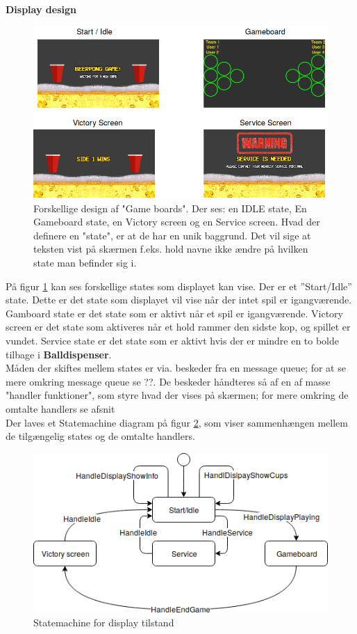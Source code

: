 \documentclass[Softwaredesign/Softwaredesign_main.tex]{subfiles}
\begin{document}
\textbf{Display design}
\begin{figure}[H]
    \centering
    \includegraphics[scale=0.5]{Softwaredesign/GUI/Pictures/Boards.png}
    \caption{Forskellige design af "Game boards". Der ses: en IDLE state,  En Gameboard state,  en Victory screen og en Service screen. Hvad der definere en "state", er  at  de har en unik baggrund. Det vil sige at teksten vist på skærmen f.eks. hold navne  ikke ændre på hvilken state man befinder sig i.  }
    \label{gameboards}
\end{figure}

På figur \ref{gameboards} kan ses forskellige states som displayet kan vise.  Der er et ''Start/Idle'' state. Dette er det state som displayet vil vise når der intet spil er igangværende. Gamboard state er det state som er aktivt når et spil er igangværende. Victory screen er det state som aktiveres når et hold rammer den sidste kop,  og spillet er vundet. Service state er det state som er aktivt hvis der er mindre en to bolde tilbage i \textbf{Balldispenser}. \\
Måden der skiftes mellem states er via. beskeder fra en message queue; for at se mere omkring message queue se ??.  De beskeder håndteres så af en af masse "handler funktioner", som styre hvad der vises på skærmen; for mere omkring de omtalte handlers se afsnit   \\
Der laves et Statemachine diagram på figur \ref{GuiDisplayStatemachine}, som viser sammenhængen mellem de tilgængelig states  og de omtalte handlers.


\begin{figure}[H]
    \centering
    \includegraphics[scale=0.8]{Softwaredesign/GUI/Pictures/Gui_displaystatemachine.png}
    \caption{Statemachine for display tilstand}
    \label{GuiDisplayStatemachine}
\end{figure}
\end{document}
